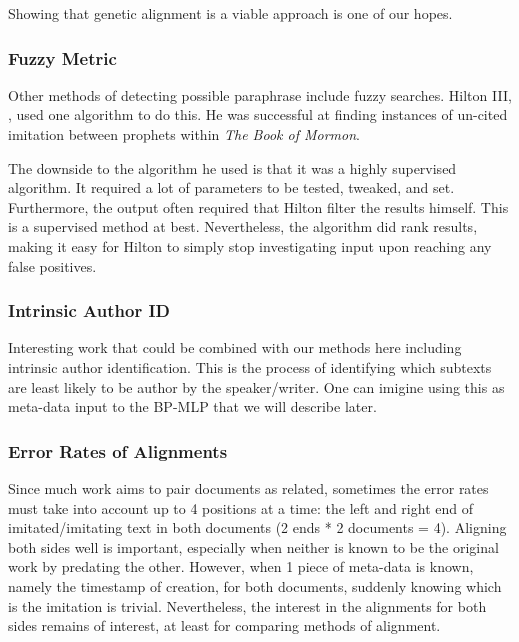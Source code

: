 Showing that genetic alignment is a viable approach is one of our hopes.

\subsubsection{Fuzzy Metric}
Other methods of detecting possible paraphrase include fuzzy searches. Hilton III, \cite{hilton_2012}, used one algorithm to do this. He was successful at finding instances of un-cited imitation between prophets within \textit{The Book of Mormon}.

The downside to the algorithm he used is that it was a highly supervised algorithm. It required a lot of parameters to be tested, tweaked, and set. Furthermore, the output often required that Hilton filter the results himself. This is a supervised method at best. Nevertheless, the algorithm did rank results, making it easy for Hilton to simply stop investigating input upon reaching any false positives.

\subsubsection{Intrinsic Author ID}
Interesting work that could be combined with our methods here including intrinsic author identification. This is the process of identifying which subtexts are least likely to be author by the speaker/writer. One can imigine using this as meta-data input to the BP-MLP that we will describe later.

\subsubsection{Error Rates of Alignments}
Since much work aims to pair documents as related, sometimes the error rates must take into account up to 4 positions at a time: the left and right end of imitated/imitating text in both documents (2 ends * 2 documents = 4). %
Aligning both sides well is important, especially when neither is known to be the original work by predating the other. However, when 1 piece of meta-data is known, namely the timestamp of creation, for both documents, suddenly knowing which is the imitation is trivial. Nevertheless, the interest in the alignments for both sides remains of interest, at least for comparing methods of alignment.
